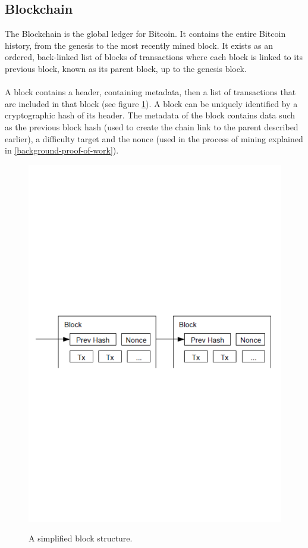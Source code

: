 \subsection{Blockchain} \label{background-blockchain}
The Blockchain is the global ledger for Bitcoin. It contains the entire Bitcoin history, from the \gls{genesis} to the most recently mined block. It exists as an ordered, back-linked list of blocks of transactions \cite{RefWorks:doc:5c39e80ae4b0854ae611b047} where each block is linked to its previous block, known as its parent block, up to the genesis block. 
\\\\
A block contains a header, containing metadata, then a list of transactions that are included in that block \cite{RefWorks:doc:5c39e80ae4b0854ae611b047} (see figure \ref{fig:simplified-block-structure}). A block can be uniquely identified by a cryptographic hash of its header. The metadata of the block contains data such as the previous block hash (used to create the chain link to the parent described earlier), a difficulty target and the nonce (used in the process of mining explained in \ref{background-proof-of-work}).  

\begin{figure}[h!]
  \centering
  \includegraphics[width = 15cm]{./figures/block-structure-simple}\\[0.5cm] 
  \caption{A simplified block structure. \cite{RefWorks:doc:5c39e80ae4b0854ae611b047}}
  \label{fig:simplified-block-structure}
\end{figure}

